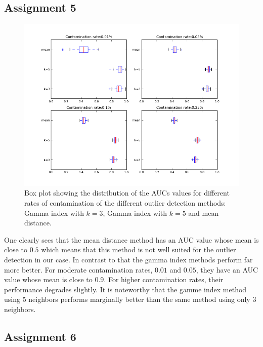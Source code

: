 \documentclass[a4paper, 12pt, titlepage]{article}
\begin{document}
\subsection*{Assignment 5}

\begin{figure}[H]
	\centering
	\includegraphics[width=17cm]{images/boxplot.png}
	\caption{Box plot showing the distribution of the AUCs values for different rates of contamination of the different outlier detection methods: Gamma index with $k=3$, Gamma index with $k=5$ and mean distance.}
\end{figure}

One clearly sees that the mean distance method has an AUC value whose mean is close to $0.5$ which means that this method is not well suited for the outlier detection in our case.
In contrast to that the gamma index methods perform far more better.
For moderate contamination rates, $0.01$ and $0.05$, they have an AUC value whose mean is close to $0.9$.
For higher contamination rates, their performance degrades slightly.
It is noteworthy that the gamme index method using $5$ neighbors performs marginally better than the same method using only $3$ neighbors.

\subsection*{Assignment 6}
\end{document}
